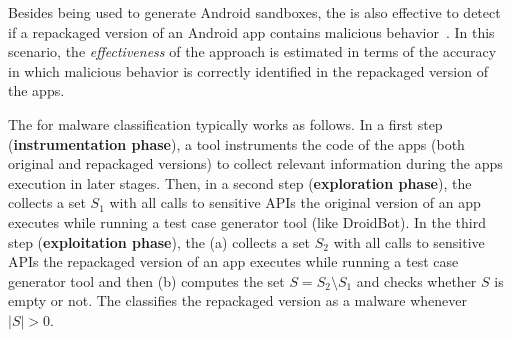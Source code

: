 Besides being used to generate Android sandboxes, the \mas is also effective 
to detect if a repackaged version of an Android app contains malicious
behavior~\cite{DBLP:conf/wcre/BaoLL18}. In this scenario, the \emph{effectiveness} of the approach
is estimated in terms of the accuracy in which malicious behavior is correctly identified in the repackaged version of the
apps.


The \mas for malware classification typically works as follows. In a first step ({\bf instrumentation phase}), 
a tool instruments the code of the apps (both original and repackaged versions) to collect relevant information
during the apps execution in later stages. Then, in a second step ({\bf exploration phase}),
the \mas collects a set $S_1$ with all calls to sensitive APIs the original version of an app executes while running a test case generator tool (like DroidBot).
In the third step ({\bf exploitation phase}), the \mas (a) collects a set $S_2$ with all calls to sensitive APIs the repackaged version of an app
executes while running a test case generator tool and then (b) computes the set $S = S_2 \setminus S_1$ and checks whether  $S$ is empty or not.
The \mas classifies the repackaged version as a malware whenever $|S| > 0$.  



